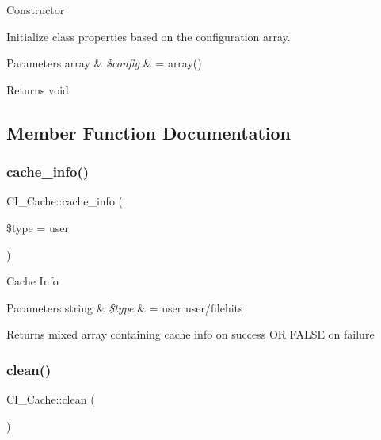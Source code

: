 Constructor

Initialize class properties based on the configuration array.


\begin{DoxyParams}[1]{Parameters}
array & {\em \$config} & = array() \\
\hline
\end{DoxyParams}
\begin{DoxyReturn}{Returns}
void 
\end{DoxyReturn}


\subsection{Member Function Documentation}
\mbox{\label{class_c_i___cache_aa4dd2ef4369608888204bbc5f810a2b7}} 
\subsubsection{\texorpdfstring{cache\+\_\+info()}{cache\_info()}}
{\footnotesize\ttfamily C\+I\+\_\+\+Cache\+::cache\+\_\+info (\begin{DoxyParamCaption}\item[{}]{\$type = {\ttfamily \textquotesingle{}user\textquotesingle{}} }\end{DoxyParamCaption})}

Cache Info


\begin{DoxyParams}[1]{Parameters}
string & {\em \$type} & = \textquotesingle{}user\textquotesingle{} user/filehits \\
\hline
\end{DoxyParams}
\begin{DoxyReturn}{Returns}
mixed array containing cache info on success OR F\+A\+L\+SE on failure 
\end{DoxyReturn}
\mbox{\label{class_c_i___cache_a0893e8103f4384c7edc7602618754c10}} 
\subsubsection{\texorpdfstring{clean()}{clean()}}
{\footnotesize\ttfamily C\+I\+\_\+\+Cache\+::clean (\begin{DoxyParamCaption}{ }\end{DoxyParamCaption})}

